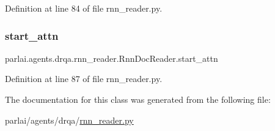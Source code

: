 Definition at line 84 of file rnn\+\_\+reader.\+py.

\mbox{\label{classparlai_1_1agents_1_1drqa_1_1rnn__reader_1_1RnnDocReader_ad3f35e5ca950ee0bc56ba3dd41f38fdb}} 
\subsubsection{\texorpdfstring{start\+\_\+attn}{start\_attn}}
{\footnotesize\ttfamily parlai.\+agents.\+drqa.\+rnn\+\_\+reader.\+Rnn\+Doc\+Reader.\+start\+\_\+attn}



Definition at line 87 of file rnn\+\_\+reader.\+py.



The documentation for this class was generated from the following file\+:\begin{DoxyCompactItemize}
\item 
parlai/agents/drqa/\hyperlink{rnn__reader_8py}{rnn\+\_\+reader.\+py}\end{DoxyCompactItemize}
